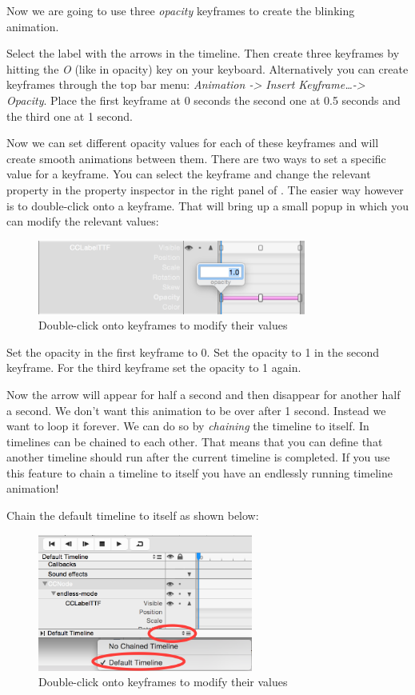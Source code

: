 Now we are going to use three \textit{opacity} keyframes to create the blinking
animation. 
\begin{leftbar}
Select the label with the arrows in the timeline. Then create three
keyframes by hitting the \textit{O} (like in opacity) key on your keyboard.
Alternatively you can create keyframes through the top bar menu:
\textit{Animation -> Insert Keyframe\ldots -> Opacity}. Place the first keyframe
at 0 seconds the second one at 0.5 seconds and the third one at 1
second.
\end{leftbar}

Now we can set different opacity values for each of these keyframes and \SB{}
will create smooth animations between them. There are two ways to set a
specific value for a keyframe. You can select the keyframe and change the
relevant property in the property inspector in the right panel of \SB{}. The
easier way however is to double-click onto a keyframe. That will bring up a
small popup in which you can modify the relevant values:
\begin{figure}[H]
\centering
\includegraphics[width=250pt]{images/Chapter7/edit_keyframe.png}
\caption{Double-click onto keyframes to modify their values}
\end{figure}

\begin{leftbar}
Set the opacity in the first keyframe to 0. Set the opacity to 1 in the second
keyframe. For the third keyframe set the opacity to 1 again.
\end{leftbar}

Now the arrow will appear for half a second and then disappear for another half
a second. We don't want this animation to be over after 1 second. Instead we
want to loop it forever. We can do so by \textit{chaining} the timeline to itself. In \SB{} timelines can be chained to
each other. That means that you can define that another timeline should run
after the current timeline is completed. If you use this feature to chain a
timeline to itself you have an endlessly running timeline animation!

\begin{leftbar}
Chain the default timeline to itself as shown below:
\begin{figure}[H]
\centering
\includegraphics[width=200pt]{images/Chapter7/chain_timeline.png}
\caption{Double-click onto keyframes to modify their values}
\end{figure}
\end{leftbar}

